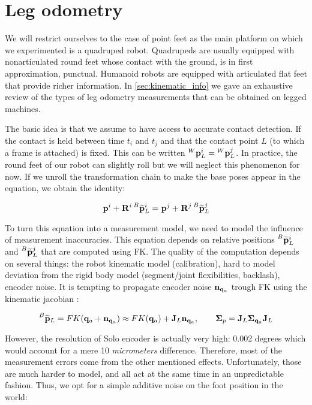 \section{Leg odometry}
We will restrict ourselves to the case of point feet as the main platform on which we experimented is a quadruped robot.
Quadrupeds are usually equipped with nonarticulated round feet whose contact with the ground, is in first approximation, punctual.
Humanoid robots are equipped with articulated flat feet that provide richer information. In \ref{sec:kinematic_info} we gave an exhaustive review of the types of leg 
odometry measurements that can be obtained on legged machines.

The basic idea is that we assume to have access to accurate contact detection. If the contact is held between time $t_i$ and $t_j$ and that
the contact point $L$ (to which a frame is attached) is fixed. This can be written $\prescript{W}{}{{\bf p}}_{L}^i = \prescript{W}{}{{\bf p}}_{L}^j$. 
In practice, the round feet of our robot can slightly roll but we will neglect this phenomenon for now. 
If we unroll the transformation chain to make the base poses appear in the equation, we obtain the identity:

\begin{equation}
    \prescript{}{}{{\bf p}}_{}^i + \prescript{}{}{{\bf R}}_{}^i \prescript{B}{}{\widetilde{{\bf p}}}_{L}^i = \prescript{}{}{{\bf p}}_{}^j + \prescript{}{}{{\bf R}}_{}^j \prescript{B}{}{\widetilde{{\bf p}}}_{L}^j
\end{equation}

To turn this equation into a measurement model, we need to model the influence of measurement inaccuracies.
This equation depends on relative positions $\prescript{B}{}{\widetilde{{\bf p}}}_{L}^i$ and $\prescript{B}{}{\widetilde{{\bf p}}}_{L}^j$ that are computed using FK. The quality of the computation depends on several things:
the robot kinematic model (calibration), hard to model deviation from the rigid body model (\eg segment/joint flexibilities, backlash), encoder noise.
It is tempting to propagate encoder noise ${\bf n}_{{\bf q}_a}$ trough FK using the kinematic jacobian \cite{bloesch2013state, hartley2018legged}:

\begin{equation}
    \prescript{B}{}{\widetilde{{\bf p}}}_{L} = FK({\bf q}_a + {\bf n}_{{\bf q}_a}) \approx FK({\bf q}_a) + {\bf J}_L{\bf n}_{{\bf q}_a}, \quad \quad {\bm \Sigma}_{p} = {\bf J}_L {\bm \Sigma}_{{\bf q}_a} {\bf J}_L
\end{equation}

However, the resolution of Solo encoder is actually very high: 0.002 degrees which would account for a mere 10 \textit{micrometers} difference.
Therefore, most of the measurement errors come from the other mentioned effects. Unfortunately, those are much harder to model, and all act at the same time
in an unpredictable fashion. Thus, we opt for a simple additive noise on the foot position in the world:


